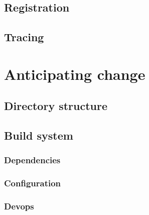 \subsection{Registration}

\subsection{Tracing}



\section{Anticipating change}


\subsection{Directory structure}

\begin{description}[font=\tt]
\item[lib]
\item[lib/t]
\item[src]
\end{description}


\subsection{Build system}


\subsubsection{Dependencies}


\subsubsection{Configuration}


\subsubsection{Devops}

